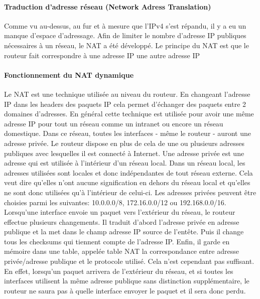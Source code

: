 \paragraph{Traduction d'adresse réseau (Network Adress Translation)}
\label{sec:nat}
Comme vu au-dessus, au fur et à mesure que l'IPv4 s'est répandu, il y a eu un manque
d'espace d'adressage. Afin de limiter le nombre d'adresse IP publiques nécessaires
à un réseau, le NAT a été développé. Le principe du NAT est
que le routeur fait correspondre à une adresse IP une autre adresse IP

\paragraph{Fonctionnement du NAT dynamique}
Le NAT est une technique utilisée au niveau du routeur. En changeant l'adresse
IP dans les headers des paquets IP cela permet d'échanger des paquets entre 2
domaines d'adresses. En général cette technique est utilisée pour avoir une
même adresse IP pour tout un réseau comme un intranet ou encore un réseau
domestique. Dans ce réseau, toutes les interfaces
- même le routeur - auront une adresse privée. Le routeur dispose en plus de
  cela de une ou plusieurs adresses publiques avec lesquelles il est connecté à
Internet. Une adresse privée est une adresse qui est utilisée à l'intérieur
d'un réseau local. Dans un réseau local, les adresses utilisées sont locales et
donc indépendantes de tout réseau externe. Cela veut dire qu'elles n'ont aucune
signification en dehors du réseau local et qu'elles ne sont donc utilisées qu'à
l'intérieur de celui-ci. Les adresses privées peuvent être choisies parmi les
suivantes: 10.0.0.0/8, 172.16.0.0/12 ou 192.168.0.0/16.
\smallbreak
Lorsqu'une interface envoie un paquet vers l'extérieur du réseau, le routeur
effectue plusieurs changements. Il traduit d'abord l'adresse privée en adresse
publique et la met dans le champ adresse IP source de l'entête. Puis il change
tous les checksums qui tiennent compte de l'adresse IP. Enfin, il garde en
mémoire dans une table, appelée table NAT la correspondance entre adresse
privée/adresse publique et le protocole utilisé.
\newline
Cela n'est cependant pas suffisant. En effet, lorsqu'un paquet arrivera de
l'extérieur du réseau, et si toutes les interfaces utilisent la même adresse
publique sans distinction supplémentaire, le routeur ne saura pas à quelle
interface envoyer le paquet et il sera donc perdu.

